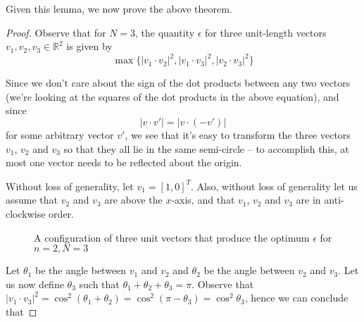 \documentclass[11pt,letterpaper,twoside,english]{article}
\theoremstyle{theorem}
\theoremstyle{remark}
\begin{document}
Given this lemma, we now prove the above theorem.

\begin{proof}
Observe that for $N=3$, the quantity $\epsilon$ for three unit-length vectors $v_1, v_2, v_3 \in \mathbb{R}^2$ is given by $$\max \{ |v_1 \cdot v_2|^2, |v_1 \cdot v_3|^2, |v_2 \cdot v_3|^2 \}$$

Since we don't care about the sign of the dot products between any two vectors (we're looking at the squares of the dot products in the above equation), and since $$|v \cdot v'| = |v \cdot (-v')|$$ for some arbitrary vector $v'$, we see that it's easy to transform the three vectors $v_1$, $v_2$ and $v_3$ so that they all lie in the same semi-circle -- to accomplish this, at most one vector needs to be reflected about the origin.

Without loss of generality, let $v_1 = [1, 0]^T$. Also, without loss of generality let us assume that $v_2$ and $v_3$ are above the $x$-axis, and that $v_1$, $v_2$ and $v_3$ are in anti-clockwise order.

\begin{figure}[!h]
    \centering
    \caption{A configuration of three unit vectors that produce the optimum $\epsilon$ for $n=2, N=3$}
\end{figure}


Let $\theta_1$ be the angle between $v_1$ and $v_2$ and $\theta_2$ be the angle between $v_2$ and $v_3$. Let us now define $\theta_3$ such that $\theta_1 + \theta_2 + \theta_3 = \pi$. Observe that $|v_1 \cdot v_3|^2 = \cos^2(\theta_1 + \theta_2) = \cos^2 (\pi - \theta_3) = \cos^2 \theta_3$, hence we can conclude that


\end{proof}
\end{document}
